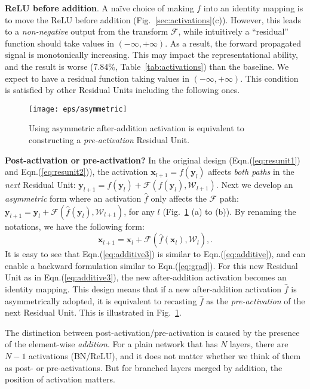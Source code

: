 \documentclass[runningheads]{llncs}
\newcommand{\ve}[1]{\mathbf{#1}} \newcommand{\ma}[1]{\mathrm{#1}}
\begin{document}
\textbf{ReLU before addition}. A na\"{i}ve choice of making $f$ into an identity mapping is to move the ReLU before addition (Fig.~\ref{sec:activations}(c)). However, this leads to a \emph{non-negative} output from the transform $\mathcal{F}$, while intuitively a ``residual'' function should take values in $(-\infty, +\infty)$. As a result, the forward propagated signal is monotonically increasing. This may impact the representational ability, and the result is worse (7.84\%, Table~\ref{tab:activations}) than the baseline.
We expect to have a residual function taking values in $(-\infty, +\infty)$. This condition is satisfied by other Residual Units including the following ones.

\begin{figure}[t]
\centering
\texttt{[image: eps/asymmetric]}
\caption{Using asymmetric after-addition activation is equivalent to constructing a \emph{pre-activation} Residual Unit.}
\label{fig:asymmetric}
\end{figure}

\textbf{Post-activation or pre-activation?}
In the original design (Eqn.(\ref{eq:resunit1}) and Eqn.(\ref{eq:resunit2})), the activation $\ve{x}_{l+1}=f(\ve{y}_{l})$ affects \emph{both paths} in the \emph{next} Residual Unit: $\ve{y}_{l+1} = f(\ve{y}_{l}) + \mathcal{F}(f(\ve{y}_{l}), \mathcal{W}_{l+1})$.
Next we develop an \emph{asymmetric} form where an activation $\hat{f}$ only affects the $\mathcal{F}$ path: $\ve{y}_{l+1} = \ve{y}_{l} + \mathcal{F}(\hat{f}(\ve{y}_{l}), \mathcal{W}_{l+1})$, for any $l$ (Fig.~\ref{fig:asymmetric} (a) to (b)). By renaming the notations, we have the following form:
\begin{equation}
\ve{x}_{l+1} = \ve{x}_{l} + \mathcal{F}(\hat{f}(\ve{x}_{l}), \mathcal{W}_{l}), \label{eq:additive3}.
\end{equation}
It is easy to see that Eqn.(\ref{eq:additive3}) is similar to Eqn.(\ref{eq:additive}), and can enable a backward formulation similar to Eqn.(\ref{eq:grad}). For this new Residual Unit as in Eqn.(\ref{eq:additive3}), the new after-addition activation becomes an identity mapping.
This design means that if a new after-addition activation $\hat{f}$ is asymmetrically adopted, it is equivalent to recasting $\hat{f}$ as the \emph{pre-activation} of the next Residual Unit. This is illustrated in Fig.~\ref{fig:asymmetric}.

The distinction between post-activation/pre-activation is caused by the presence of the element-wise \emph{addition}. For a plain network that has $N$ layers, there are $N-1$ activations (BN/ReLU), and it does not matter whether we think of them as post- or pre-activations. But for branched layers merged by addition, the position of activation matters.
\end{document}

